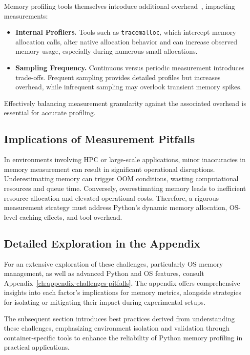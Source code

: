 Memory profiling tools themselves introduce additional overhead~\cite{scalene}, impacting measurements:

\begin{itemize}

    \item \textbf{Internal Profilers.} Tools such as \texttt{tracemalloc}, which intercept memory allocation calls, alter native allocation behavior and can increase observed memory usage, especially during numerous small allocations.

    \item \textbf{Sampling Frequency.} Continuous versus periodic measurement introduces trade-offs. Frequent sampling provides detailed profiles but increases overhead, while infrequent sampling may overlook transient memory spikes.

\end{itemize}

Effectively balancing measurement granularity against the associated overhead is essential for accurate profiling.

\subsection{Implications of Measurement Pitfalls}
\label{subsec:mmc-challenges-why-care}

In environments involving \ac{HPC} or large-scale applications, minor inaccuracies in memory measurement can result in significant operational disruptions.
Underestimating memory can trigger \ac{OOM} conditions, wasting computational resources and queue time.
Conversely, overestimating memory leads to inefficient resource allocation and elevated operational costs.
Therefore, a rigorous measurement strategy must address Python's dynamic memory allocation, \ac{OS}-level caching effects, and tool overhead.

\subsection{Detailed Exploration in the Appendix}
\label{subsec:mmc-challenges-appendix-ref}

For an extensive exploration of these challenges, particularly \ac{OS} memory management, as well as advanced Python and \ac{OS} features, consult Appendix~\ref{ch:appendix-challenges-pitfalls}.
The appendix offers comprehensive insights into each factor's implications for memory metrics, alongside strategies for isolating or mitigating their impact during experimental setups.

The subsequent section introduces best practices derived from understanding these challenges, emphasizing environment isolation and validation through container-specific tools to enhance the reliability of Python memory profiling in practical applications.